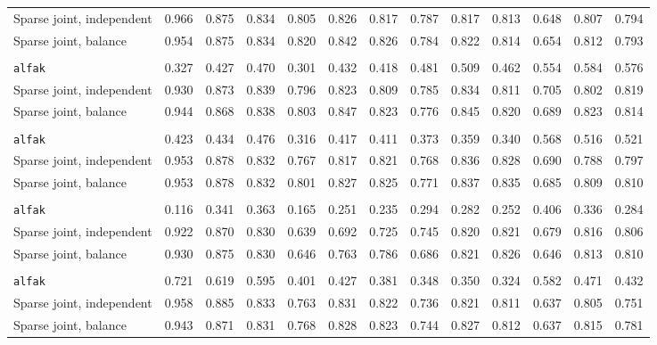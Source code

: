 \begin{center}
\begin{tabular}{l*{12}{r}}
\quad Sparse joint, independent & 0.966 & 0.875 & 0.834 & 0.805 & 0.826 & 0.817 & 0.787 & 0.817 & 0.813 & 0.648 & 0.807 & 0.794 \\
\quad Sparse joint, balance & 0.954 & 0.875 & 0.834 & 0.820 & 0.842 & 0.826 & 0.784 & 0.822 & 0.814 & 0.654 & 0.812 & 0.793 \\
\addlinespace[2pt]
\multicolumn{13}{l}{\textit{500/700, 1080 d}} \\
\quad \texttt{alfak} & 0.327 & 0.427 & 0.470 & 0.301 & 0.432 & 0.418 & 0.481 & 0.509 & 0.462 & 0.554 & 0.584 & 0.576 \\
\quad Sparse joint, independent & 0.930 & 0.873 & 0.839 & 0.796 & 0.823 & 0.809 & 0.785 & 0.834 & 0.811 & 0.705 & 0.802 & 0.819 \\
\quad Sparse joint, balance & 0.944 & 0.868 & 0.838 & 0.803 & 0.847 & 0.823 & 0.776 & 0.845 & 0.820 & 0.689 & 0.823 & 0.814 \\
\addlinespace[2pt]
\multicolumn{13}{l}{\textit{500/700, bottleneck}} \\
\quad \texttt{alfak} & 0.423 & 0.434 & 0.476 & 0.316 & 0.417 & 0.411 & 0.373 & 0.359 & 0.340 & 0.568 & 0.516 & 0.521 \\
\quad Sparse joint, independent & 0.953 & 0.878 & 0.832 & 0.767 & 0.817 & 0.821 & 0.768 & 0.836 & 0.828 & 0.690 & 0.788 & 0.797 \\
\quad Sparse joint, balance & 0.953 & 0.878 & 0.832 & 0.801 & 0.827 & 0.825 & 0.771 & 0.837 & 0.835 & 0.685 & 0.809 & 0.810 \\
\addlinespace[2pt]
\multicolumn{13}{l}{\textit{100/3000, 360 d}} \\
\quad \texttt{alfak} & 0.116 & 0.341 & 0.363 & 0.165 & 0.251 & 0.235 & 0.294 & 0.282 & 0.252 & 0.406 & 0.336 & 0.284 \\
\quad Sparse joint, independent & 0.922 & 0.870 & 0.830 & 0.639 & 0.692 & 0.725 & 0.745 & 0.820 & 0.821 & 0.679 & 0.816 & 0.806 \\
\quad Sparse joint, balance & 0.930 & 0.875 & 0.830 & 0.646 & 0.763 & 0.786 & 0.686 & 0.821 & 0.826 & 0.646 & 0.813 & 0.810 \\
\addlinespace[2pt]
\multicolumn{13}{l}{\textit{3000/100, 360 d}} \\
\quad \texttt{alfak} & 0.721 & 0.619 & 0.595 & 0.401 & 0.427 & 0.381 & 0.348 & 0.350 & 0.324 & 0.582 & 0.471 & 0.432 \\
\quad Sparse joint, independent & 0.958 & 0.885 & 0.833 & 0.763 & 0.831 & 0.822 & 0.736 & 0.821 & 0.811 & 0.637 & 0.805 & 0.751 \\
\quad Sparse joint, balance & 0.943 & 0.871 & 0.831 & 0.768 & 0.828 & 0.823 & 0.744 & 0.827 & 0.812 & 0.637 & 0.815 & 0.781 \\
\bottomrule
\end{tabular}
\end{center}


